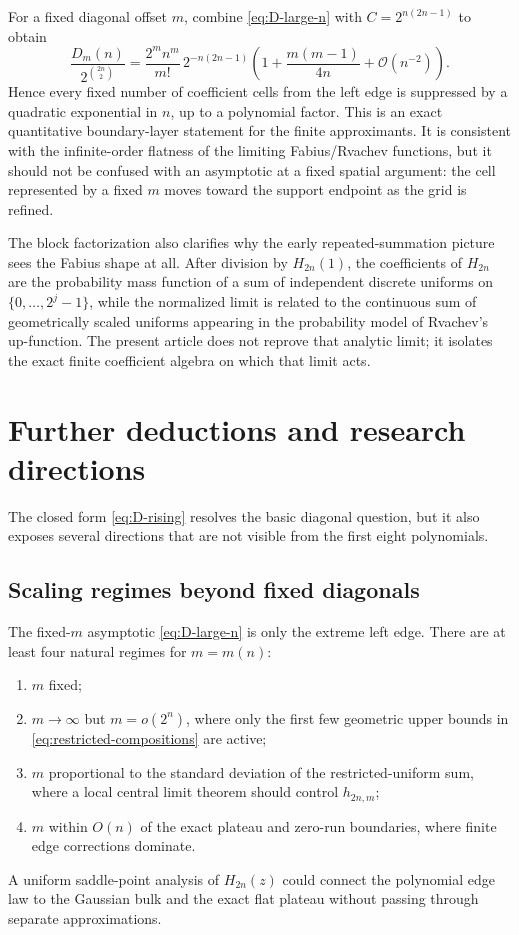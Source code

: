 \documentclass[11pt,oneside]{article}
\theoremstyle{definition}
\theoremstyle{remark}
\newcommand{\Diag}{D}
\newcommand{\bigO}{\mathcal O}
\begin{document}
For a fixed diagonal offset $m$, combine \eqref{eq:D-large-n} with
$C=2^{n(2n-1)}$ to obtain
\begin{equation}
 \frac{\Diag_m(n)}{2^{\binom{2n}{2}}}
 =\frac{2^mn^m}{m!}\,2^{-n(2n-1)}
 \left(1+\frac{m(m-1)}{4n}+\bigO(n^{-2})\right).
 \label{eq:normalized-diagonal-asymptotic}
\end{equation}
Hence every fixed number of coefficient cells from the left edge is
suppressed by a quadratic exponential in $n$, up to a polynomial factor.
This is an exact quantitative boundary-layer statement for the finite
approximants.  It is consistent with the infinite-order flatness of the
limiting Fabius/Rvachev functions, but it should not be confused with an
asymptotic at a fixed spatial argument: the cell represented by a fixed $m$
moves toward the support endpoint as the grid is refined.

The block factorization also clarifies why the early repeated-summation
picture sees the Fabius shape at all.  After division by $H_{2n}(1)$, the coefficients of $H_{2n}$ are the
probability mass function of a sum of independent discrete uniforms on
$\{0,\ldots,2^j-1\}$, while the normalized limit is related to the continuous
sum of geometrically scaled uniforms appearing in the probability model of
Rvachev's up-function.  The present article does not reprove that analytic
limit; it isolates the exact finite coefficient algebra on which that limit
acts.

\section{Further deductions and research directions}
\label{sec:future}

The closed form \eqref{eq:D-rising} resolves the basic diagonal question, but
it also exposes several directions that are not visible from the first eight
polynomials.

\subsection{Scaling regimes beyond fixed diagonals}

The fixed-$m$ asymptotic \eqref{eq:D-large-n} is only the extreme left edge.
There are at least four natural regimes for $m=m(n)$:
\begin{enumerate}
 \item $m$ fixed;
 \item $m\to\infty$ but $m=o(2^n)$, where only the first few geometric upper
       bounds in \eqref{eq:restricted-compositions} are active;
 \item $m$ proportional to the standard deviation of the restricted-uniform
       sum, where a local central limit theorem should control $h_{2n,m}$;
 \item $m$ within $O(n)$ of the exact plateau and zero-run boundaries, where
       finite edge corrections dominate.
\end{enumerate}
A uniform saddle-point analysis of
$H_{2n}(z)$ could connect the polynomial edge law to the Gaussian bulk and
the exact flat plateau without passing through separate approximations.
\end{document}
